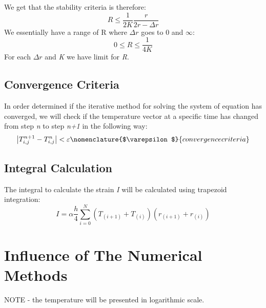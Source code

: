 \documentclass[11pt, a4paper]{article}
\begin{document}
We get that the stability criteria is therefore:
\begin{equation}
    R\le\frac{1}{2K}\frac{r}{2r-\Delta r}
\end{equation}
We essentially have a range of R where $\Delta r$ goes to 0 and $\infty$:
\begin{equation}
    0\le R\le\frac{1}{4K}
\end{equation}
For each $\Delta r$ and \emph{K} we have limit for \emph{R}.

\subsection{Convergence Criteria}
In order determined if the iterative method for solving the system of equation has converged, we will check if the temperature vector at a specific time has changed from step \emph{n} to step \emph{n+1} in the following way:
\begin{equation}
    \left|T_{i,j}^{n+1}-T_{i,j}^n\right|<\varepsilon
    \nomenclature{$\varepsilon$}{convergence criteria}
\end{equation}

\subsection{Integral Calculation}
The integral to calculate the strain \emph{I} will be calculated using trapezoid integration:
\begin{equation}
    I=\alpha\frac{h}{4}\sum_{i=0}^{N}{\left(T_{\left(i+1\right)}+T_{\left(i\right)}\right)\left(r_{\left(i+1\right)}+r_{\left(i\right)}\right)}
\end{equation}

\section{Influence of The Numerical Methods}
NOTE - the temperature will be presented in logarithmic scale.
\end{document}
